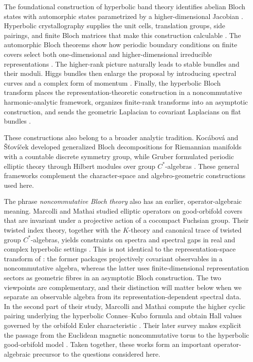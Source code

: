 \documentclass[11pt]{article}
\theoremstyle{definition}
\theoremstyle{remark}
\begin{document}
The foundational construction of hyperbolic band theory identifies abelian
Bloch states with automorphic states parametrized by a higher-dimensional
Jacobian \cite{MaciejkoRayan2021}.  Hyperbolic crystallography supplies the
unit cells, translation groups, side pairings, and finite Bloch matrices that
make this construction calculable \cite{BoettcherEtAl2022}.  The automorphic
Bloch theorems show how periodic boundary conditions on finite covers select
both one-dimensional and higher-dimensional irreducible representations
\cite{MaciejkoRayan2022}.  The higher-rank picture naturally leads to stable
bundles and their moduli.  Higgs bundles then enlarge the proposal by
introducing spectral curves and a complex form of momentum
\cite{KienzleRayan2022}.  Finally, the hyperbolic Bloch transform places the
representation-theoretic construction in a noncommutative
harmonic-analytic framework, organizes finite-rank transforms into an
asymptotic construction, and sends the geometric Laplacian to covariant
Laplacians on flat bundles \cite{NagyRayan2024}.

These constructions also belong to a broader analytic tradition.
Koc\'abov\'a and \v{S}\v{t}ov\'i\v{c}ek developed generalized Bloch
decompositions for Riemannian manifolds with a countable discrete symmetry
group, while Gruber formulated periodic elliptic theory through Hilbert
modules over group \(C^*\)-algebras
\cite{KocabovaStovicek2008,Gruber2001}.  These general frameworks complement
the character-space and algebro-geometric constructions used here.

The phrase \emph{noncommutative Bloch theory} also has an earlier,
operator-algebraic meaning.  Marcolli and Mathai studied elliptic operators
on good-orbifold covers that are invariant under a projective action of a
cocompact Fuchsian group.  Their twisted index theory, together with the
\(K\)-theory and canonical trace of twisted group \(C^*\)-algebras, yields
constraints on spectra and spectral gaps in real and complex hyperbolic
settings \cite{MarcolliMathai1999}.  This is not identical to the
representation-space transform of \cite{NagyRayan2024}: the former packages
projectively covariant observables in a noncommutative algebra, whereas the
latter uses finite-dimensional representation sectors as geometric fibres
in an asymptotic Bloch construction.  The two viewpoints are complementary,
and their distinction will matter below when we separate an observable
algebra from its representation-dependent spectral data.  In the second
part of their study, Marcolli and Mathai compute the
higher cyclic pairing underlying the hyperbolic Connes--Kubo formula and
obtain Hall values governed by the orbifold Euler characteristic
\cite{MarcolliMathai2001}.  Their later survey makes explicit the passage from
the Euclidean magnetic noncommutative torus to the hyperbolic good-orbifold
model \cite{MarcolliMathai2006}.  Taken together, these works form an
important operator-algebraic precursor to the questions considered here.
\end{document}

